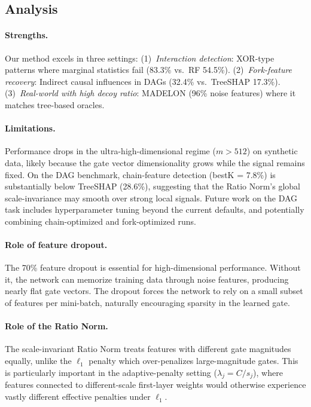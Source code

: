 \documentclass{uai2026} %
\theoremstyle{definition}
\theoremstyle{remark}
\begin{document}
\subsection{Analysis}\label{sec:analysis}

\paragraph{Strengths.}
Our method excels in three settings:
(1)~\emph{Interaction detection}: XOR-type patterns where marginal statistics fail (83.3\% vs.\ RF 54.5\%).
(2)~\emph{Fork-feature recovery}: Indirect causal influences in DAGs (32.4\% vs.\ TreeSHAP 17.3\%).
(3)~\emph{Real-world with high decoy ratio}: MADELON (96\% noise features) where it matches tree-based oracles.

\paragraph{Limitations.}
Performance drops in the ultra-high-dimensional regime ($m > 512$) on synthetic data, likely because the gate vector dimensionality grows while the signal remains fixed.
On the DAG benchmark, chain-feature detection (bestK = 7.8\%) is substantially below TreeSHAP (28.6\%), suggesting that the Ratio Norm's global scale-invariance may smooth over strong local signals.
Future work on the DAG task includes hyperparameter tuning beyond the current defaults, and potentially combining chain-optimized and fork-optimized runs.

\paragraph{Role of feature dropout.}
The 70\% feature dropout is essential for high-dimensional performance.
Without it, the network can memorize training data through noise features, producing nearly flat gate vectors.
The dropout forces the network to rely on a small subset of features per mini-batch, naturally encouraging sparsity in the learned gate.

\paragraph{Role of the Ratio Norm.}
The scale-invariant Ratio Norm treats features with different gate magnitudes equally, unlike the $\ell_1$ penalty which over-penalizes large-magnitude gates.
This is particularly important in the adaptive-penalty setting ($\lambda_j = C/s_j$), where features connected to different-scale first-layer weights would otherwise experience vastly different effective penalties under $\ell_1$.
\end{document}
